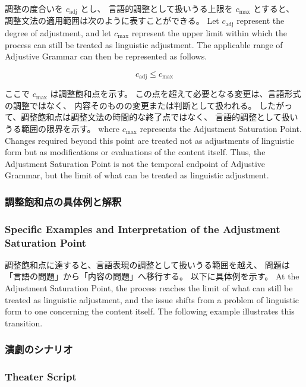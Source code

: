 \documentclass[a4paper]{article}
\begin{document}
\ifJPN
調整の度合いを \(c_{\text{adj}}\) とし、
言語的調整として扱いうる上限を \(c_{\text{max}}\) とすると、
調整文法の適用範囲は次のように表すことができる。
\else
Let \(c_{\text{adj}}\) represent the degree of adjustment,
and let \(c_{\text{max}}\) represent the upper limit within which
the process can still be treated as linguistic adjustment.
The applicable range of Adjustive Grammar can then be represented as follows.
\fi

\begin{equation}
c_{\text{adj}} \leq c_{\text{max}}
\end{equation}

\ifJPN
ここで \(c_{\text{max}}\) は調整飽和点を示す。
この点を超えて必要となる変更は、言語形式の調整ではなく、
内容そのものの変更または判断として扱われる。
したがって、調整飽和点は調整文法の時間的な終了点ではなく、
言語的調整として扱いうる範囲の限界を示す。
\else
where \(c_{\text{max}}\) represents the Adjustment Saturation Point.
Changes required beyond this point are treated not as adjustments
of linguistic form but as modifications or evaluations of the content itself.
Thus, the Adjustment Saturation Point is not the temporal endpoint
of Adjustive Grammar, but the limit of what can be treated as linguistic adjustment.
\fi

\ifJPN
\subsubsection{調整飽和点の具体例と解釈}
\else
\subsubsection{Specific Examples and Interpretation of the Adjustment Saturation Point}
\fi
\ifJPN
調整飽和点に達すると、言語表現の調整として扱いうる範囲を越え、
問題は「言語の問題」から「内容の問題」へ移行する。
以下に具体例を示す。
\else
At the Adjustment Saturation Point, the process reaches the limit of what can still be treated as linguistic adjustment, and the issue shifts from a problem of linguistic form to one concerning the content itself. The following example illustrates this transition.
\fi

\ifJPN
\subsubsection*{演劇のシナリオ}
\else
\subsubsection*{Theater Script}
\fi
\end{document}
